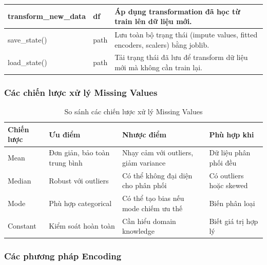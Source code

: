 \documentclass[12pt,a4paper]{article}
\begin{document}
\begin{table}[H]
\begin{tabular}{|>{\raggedright\arraybackslash\ttfamily}p{3.8cm}|
                >{\raggedright\arraybackslash}p{3cm}|
                >{\raggedright\arraybackslash}p{8cm}|}
transform\_new\_data & df &
Áp dụng transformation đã học từ train lên dữ liệu mới. \\
\hline

save\_state() & path &
Lưu toàn bộ trạng thái (impute values, fitted encoders, scalers) bằng joblib. \\
\hline

load\_state() & path &
Tải trạng thái đã lưu để transform dữ liệu mới mà không cần train lại. \\
\hline

\end{tabular}
\end{table}


\subsubsection{Các chiến lược xử lý Missing Values}

\begin{table}[H]
\centering
\caption{So sánh các chiến lược xử lý Missing Values}
\label{tab:missing_strategies}
\begin{tabular}{|l|p{4cm}|p{4cm}|p{3cm}|}
\hline
\textbf{Chiến lược} & \textbf{Ưu điểm} & \textbf{Nhược điểm} & \textbf{Phù hợp khi} \\
\hline
Mean & Đơn giản, bảo toàn trung bình & Nhạy cảm với outliers, giảm variance & Dữ liệu phân phối đều \\
\hline
Median & Robust với outliers & Có thể không đại diện cho phân phối & Có outliers hoặc skewed \\
\hline
Mode & Phù hợp categorical & Có thể tạo bias nếu mode chiếm ưu thế & Biến phân loại \\
\hline
Constant & Kiểm soát hoàn toàn & Cần hiểu domain knowledge & Biết giá trị hợp lý \\
\hline
\end{tabular}
\end{table}

\subsubsection{Các phương pháp Encoding}
\end{document}
